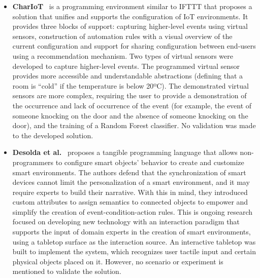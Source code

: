 \begin{itemize}
\item\textbf{CharIoT}~\cite{chariot} is a programming environment similar to IFTTT that proposes a solution that unifies and supports the configuration of IoT environments. It provides three blocks of support: capturing higher-level events using virtual sensors, construction of automation rules with a visual overview of the current configuration and support for sharing configuration between end-users using a recommendation mechanism. Two types of virtual sensors were developed to capture higher-level events. The programmed virtual sensor provides more accessible and understandable abstractions (defining that a room is ``cold'' if the temperature is below 20ºC). The demonstrated virtual sensors are more complex, requiring the user to provide a demonstration of the occurrence and lack of occurrence of the event (for example, the event of someone knocking on the door and the absence of someone knocking on the door), and the training of a Random Forest classifier. No validation was made to the developed solution.

\item\textbf{Desolda et al.}~\cite{desolda} proposes a tangible programming language that allows non-programmers to configure smart objects' behavior to create and customize smart environments. The authors defend that the synchronization of smart devices cannot limit the personalization of a smart environment, and it may require experts to build their narrative. With this in mind, they introduced custom attributes to assign semantics to connected objects to empower and simplify the creation of event-condition-action rules. This is ongoing research focused on developing new technology with an interaction paradigm that supports the input of domain experts in the creation of smart environments, using a tabletop surface as the interaction source. An interactive tabletop was built to implement the system, which recognizes user tactile input and certain physical objects placed on it. However, no scenario or experiment is mentioned to validate the solution.


\end{itemize}
